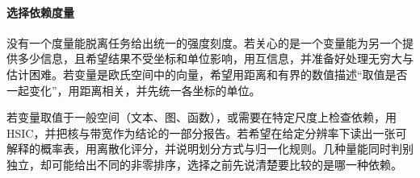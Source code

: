 \paragraph{选择依赖度量}
没有一个度量能脱离任务给出统一的强度刻度。若关心的是一个变量能为另一个提供多少信息，且希望结果不受坐标和单位影响，用互信息，并准备好处理无穷大与估计困难。若变量是欧氏空间中的向量，希望用距离和有界的数值描述“取值是否一起变化”，用距离相关，并先统一各坐标的单位。

若变量取值于一般空间（文本、图、函数），或需要在特定尺度上检查依赖，用HSIC，并把核与带宽作为结论的一部分报告。若希望在给定分辨率下读出一张可解释的概率表，用离散化评分，并说明划分方式与归一化规则。几种量能同时判别独立，却可能给出不同的非零排序，选择之前先说清楚要比较的是哪一种依赖。
